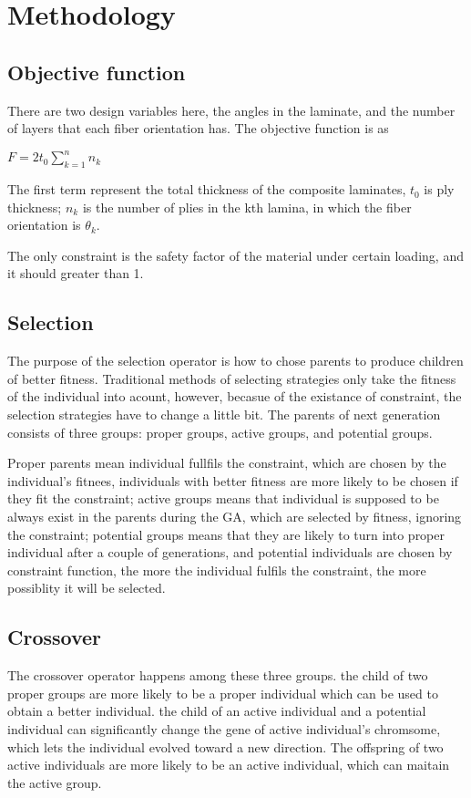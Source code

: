
\section{Methodology}
\subsection{Objective function}
There are two design variables here, the angles in the laminate, and the number of layers that each
fiber orientation has. The objective function is as

$F  = 2t_0 \sum_{k=1}^n n_k$ 

The first term represent the total thickness of the composite laminates, $t_0$ is ply thickness;
$n_k$ is the number of plies in the kth lamina, in which the fiber orientation is $\theta_k$.

The only constraint is the safety factor of the material under certain loading, and it should
greater than 1.

\subsection{Selection}
The purpose of the selection operator is how to chose parents to produce children of better
fitness. Traditional methods of selecting strategies only take the fitness of the individual into
acount, however, becasue of the existance of constraint, the selection strategies have to change a
little bit. The parents of next generation consists of three groups: proper groups, active groups,
and potential groups. 

Proper parents mean individual fullfils the constraint, which are chosen by the individual's
fitnees, individuals with better fitness are more likely to be chosen if they fit the constraint;
active groups means that individual is supposed to be always exist in the parents during the GA,
which are selected by fitness, ignoring the constraint; potential groups means that they are likely
to turn into proper individual after a couple of generations, and potential individuals are chosen
by constraint function, the more the individual fulfils the constraint, the more possiblity it will
be selected.


	
\subsection{Crossover}
The crossover operator happens among these three groups. the child of two proper groups are more
likely to be a proper individual which can be used to obtain a better individual. the child of an
active individual and a potential individual can significantly change the gene of active
individual's chromsome, which lets the individual evolved toward a new direction.  The offspring of
two active individuals are more likely to be an active individual, which can maitain the active
group.
